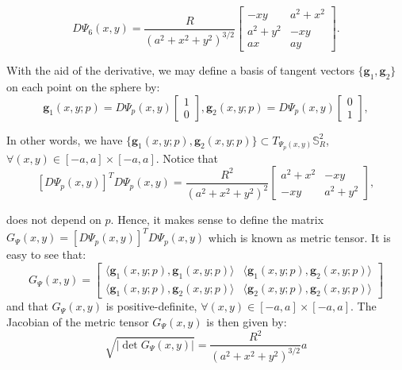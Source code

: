 \begin{equation}
	\label{chp3-eqdistant-dpsi6}
	D\Psi_{6}(x,y) = \frac{R}{{(a^2 + x^2 + y^2)}^{3/2}}
	\begin{bmatrix}
		 -xy  &  a^2+x^2 \\
		 a^2+y^2  &  -xy \\
		 ax &  ay
	\end{bmatrix}.
\end{equation}

With the aid of the derivative, we may define a basis of tangent vectors 
$\{ \boldsymbol{g}_{1}, \boldsymbol{g}_{2} \}$ on each point on the sphere by:
\begin{equation}
	\boldsymbol{g}_{1}(x,y;p) = D\Psi_{p}(x,y)
	\begin{bmatrix}
		 1 \\
		 0
	\end{bmatrix},
	\boldsymbol{g}_{2}(x,y;p) = D\Psi_{p}(x,y)
	\begin{bmatrix}
		 0 \\
		 1
	\end{bmatrix},
\end{equation}

In other words, we have $\{\boldsymbol{g}_{1}(x,y;p),\boldsymbol{g}_{2}(x,y;p)\} \subset T_{\Psi_p(x,y)}
\mathbb{S}_{R}^2$, $\forall (x,y) \in [-a,a]\times[-a,a]$.
Notice that
\begin{equation}
	\label{chp3-eqdistant-psitensor}
	[D\Psi_{p}(x,y)]^TD\Psi_{p}(x,y)
	= \frac{R^2}{(a^2 + x^2 + y^2)^2}
	\begin{bmatrix}
		 a^2 + x^2 &  -xy \\
		 -xy & a^2 + y^2
	\end{bmatrix},
\end{equation}

does not depend on $p$.
Hence, it makes sense to define the matrix 
$G_{\Psi}(x,y) = [D\Psi_{p}(x,y)]^TD\Psi_{p}(x,y)$ 
which is known as metric tensor.
It is easy to see that:
\begin{equation}
	\label{chp3-eqdistant-psi-metric-tensor}
	G_{\Psi}(x,y) = 
	\begin{bmatrix}
		\langle \boldsymbol{g}_{1}(x,y;p), \boldsymbol{g}_{1}(x,y;p) \rangle & 
		\langle \boldsymbol{g}_{1}(x,y;p), \boldsymbol{g}_{2}(x,y;p) \rangle \\
		\langle \boldsymbol{g}_{1}(x,y;p), \boldsymbol{g}_{2}(x,y;p) \rangle  &
		\langle \boldsymbol{g}_{2}(x,y;p), \boldsymbol{g}_{2}(x,y;p) \rangle 
	\end{bmatrix}
\end{equation}
and that $G_{\Psi}(x,y)$ is positive-definite, 
$\forall (x,y) \in [-a,a]\times[-a,a]$.
The Jacobian of the metric tensor $G_{\Psi}(x,y)$ is then given by:
\begin{equation}
	\sqrt{|\det{G_{\Psi}(x,y)}|} = \frac{R^2}{(a^2+x^2+y^2)^{3/2}}a 
\end{equation}

